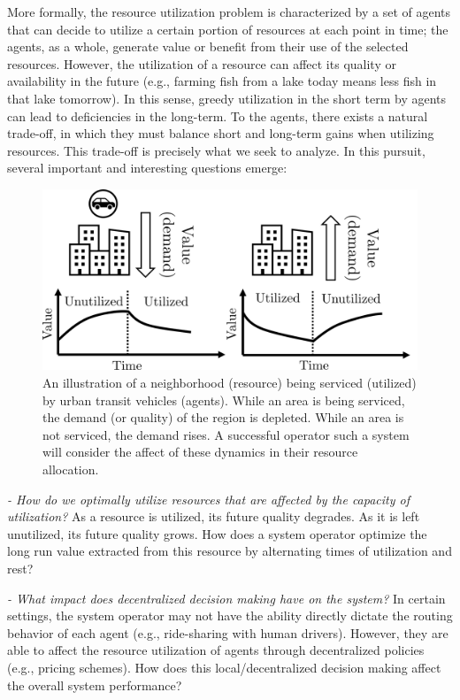 \documentclass[letterpaper, 10 pt, conference]{ieeeconf}
\begin{document}
More formally, the resource utilization problem is characterized by a set of agents that can decide to utilize a certain portion of resources at each point in time; the agents, as a whole, generate value or benefit from their use of the selected resources. However, the utilization of a resource can affect its quality or availability in the future (e.g., farming fish from a lake today means less fish in that lake tomorrow). In this sense, greedy utilization in the short term by agents can lead to deficiencies in the long-term. To the agents, there exists a natural trade-off, in which they must balance short and long-term gains when utilizing resources. This trade-off is precisely what we seek to analyze. In this pursuit, several important and interesting questions emerge:
\\

\begin{figure}
    \centering
    \includegraphics[width=\columnwidth]{fig_city_2.png}
    \caption{An illustration of a neighborhood (resource) being serviced (utilized) by urban transit vehicles (agents). While an area is being serviced, the demand (or quality) of the region is depleted. While an area is not serviced, the demand rises. A successful operator such a system will consider the affect of these dynamics in their resource allocation.}
    \label{fig:app}
    \vspace{-5mm}
\end{figure}

\noindent\textit{- How do we optimally utilize resources that are affected by the capacity of utilization?} As a resource is utilized, its future quality degrades. As it is left unutilized, its future quality grows. How does a system operator optimize the long run value extracted from this resource by alternating times of utilization and rest?

\noindent\textit{- What impact does decentralized decision making have on the system?} In certain settings, the system operator may not have the ability directly dictate the routing behavior of each agent (e.g., ride-sharing with human drivers). However, they are able to affect the resource utilization of agents through decentralized policies (e.g., pricing schemes). How does this local/decentralized decision making affect the overall system performance?
\end{document}
